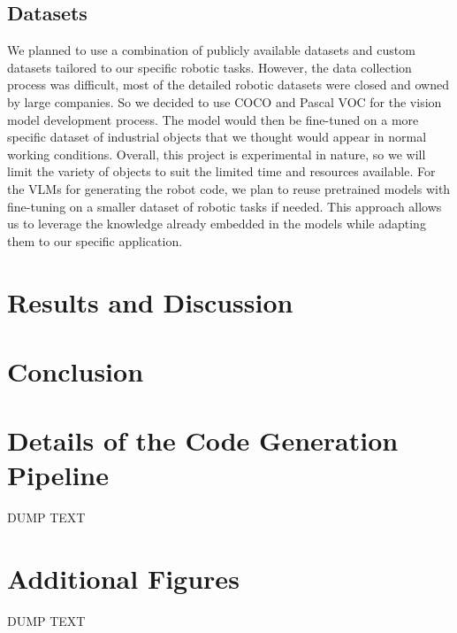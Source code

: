 \documentclass[conference]{IEEEtran}
\begin{document}
\subsection{Datasets}

We planned to use a combination of publicly available datasets and custom datasets tailored to our specific robotic tasks. However, the data collection process was difficult, most of the detailed robotic datasets were closed and owned by large companies. So we decided to use COCO\cite{DBLP:journals/corr/LinMBHPRDZ14} and Pascal\cite{everingham2010pascal} VOC for the vision model development process.
The model would then be fine-tuned on a more specific dataset of industrial objects that we thought would appear in normal working conditions.
Overall, this project is experimental in nature, so we will limit the variety of objects to suit the limited time and resources available.
For the VLMs for generating the robot code, we plan to reuse pretrained models with fine-tuning on a smaller dataset of robotic tasks if needed. This approach allows us to leverage the knowledge already embedded in the models while adapting them to our specific application.


\section{Results and Discussion}

\section{Conclusion}

\appendices
\section{Details of the Code Generation Pipeline}
DUMP TEXT

\section{Additional Figures}
DUMP TEXT



\vspace{12pt}
\end{document}
